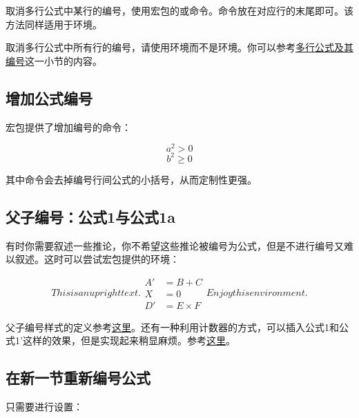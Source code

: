 取消多行公式中某行的编号，使用宏包的或命令。命令放在对应行的末尾即可。该方法同样适用于环境。

取消多行公式中所有行的编号，请使用环境而不是环境。你可以参考\hyperref[subsec:multieqnum]{多行公式及其编号}这一小节的内容。

\subsection{增加公式编号}
宏包提供了增加编号的命令：

\begin{codeshow}
\[a^2>0 \tag{$\star$}\]
\begin{equation}
b^2 \geqslant 0
\tag*{[Axiom]}
\end{equation}
\end{codeshow}

其中命令会去掉编号行间公式的小括号，从而定制性更强。

\subsection{父子编号：公式1与公式1a}
有时你需要叙述一些推论，你不希望这些推论被编号为公式，但是不进行编号又难以叙述。这时可以尝试宏包提供的环境：

\begin{codeshow}
\begin{subequations}
This is an upright text.
\begin{align}
A' &=B+C \\
X &=0 \nonumber \\
D' &=E \times F
\end{align}
Enjoy this environment.
\end{subequations}
\end{codeshow}

父子编号样式的定义参考\hyperref[code:parenteqnum]{这里}。还有一种利用计数器的方式，可以插入公式1和公式1'这样的效果，但是实现起来稍显麻烦。参考\hyperref[code:eq1plus]{这里}。

\subsection{在新一节重新编号公式}
只需要进行设置：
\begin{latex}
\end{latex}


